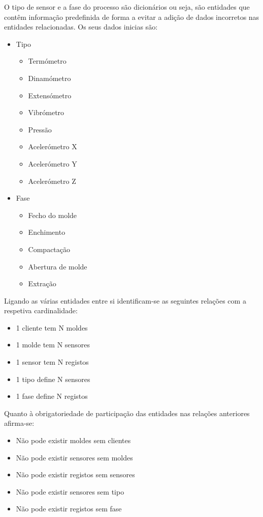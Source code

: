 \documentclass[11pt,twoside,a4paper]{report}
\begin{document}
O tipo de sensor e a fase do processo são dicionários ou seja, são entidades que contêm informação predefinida de forma a evitar a adição de dados incorretos nas entidades relacionadas. Os seus dados inicias são:
\begin{itemize}[noitemsep]
	\item Tipo
	\begin{itemize}[noitemsep]
		\item Termómetro
		\item Dinamómetro
		\item Extensómetro
		\item Vibrómetro
		\item Pressão
		\item Acelerómetro X
		\item Acelerómetro Y
		\item Acelerómetro Z
	\end{itemize}
	\item Fase
	\begin{itemize}[noitemsep]
		\item Fecho do molde
		\item Enchimento
		\item Compactação
		\item Abertura de molde
		\item Extração
	\end{itemize}
\end{itemize}
Ligando as várias entidades entre si identificam-se as seguintes relações com a respetiva cardinalidade:
\begin{itemize}[noitemsep]
	\item 1 cliente tem N moldes
	\item 1 molde tem N sensores
	\item 1 sensor tem N registos
	\item 1 tipo define N sensores
	\item 1 fase define N registos
\end{itemize}
Quanto à obrigatoriedade de participação das entidades nas relações anteriores afirma-se:
\begin{itemize}[noitemsep]
	\item Não pode existir moldes sem clientes
	\item Não pode existir sensores sem moldes
	\item Não pode existir registos sem sensores
	\item Não pode existir sensores sem tipo
	\item Não pode existir registos sem fase	
\end{itemize}
\end{document}

